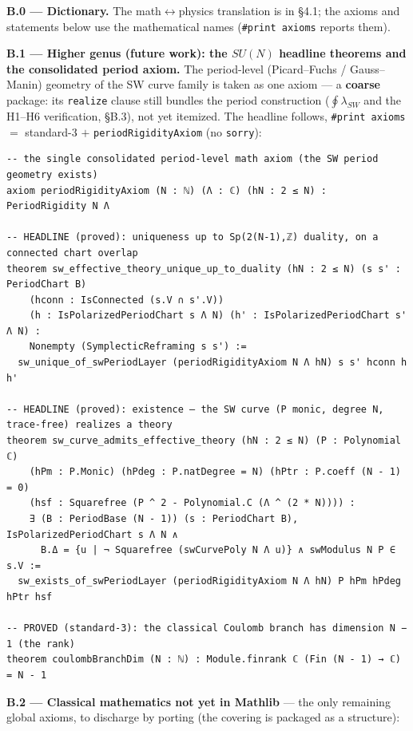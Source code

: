 \documentclass{article}
\theoremstyle{plain}
\theoremstyle{definition}
\numberwithin{equation}{section}
\newcommand{\code}[1]{\texttt{#1}}
\begin{document}
\medskip
\medskip
\noindent\textbf{B.0 --- Dictionary.} The math$\leftrightarrow$physics translation is in \S4.1; the
axioms and statements below use the mathematical names (\code{\#print axioms} reports them).

\medskip
\noindent\textbf{B.1 --- Higher genus (future work): the $SU(N)$ headline theorems and the consolidated period axiom.} The period-level
(Picard--Fuchs / Gauss--Manin) geometry of the SW curve family is taken as one axiom --- a
\textbf{coarse} package: its \code{realize} clause still bundles the period construction
($\oint\lambda_{SW}$ and the H1--H6 verification, \S B.3), not yet itemized. The headline follows, \code{\#print axioms} $=$ standard-3 $+$ \code{periodRigidityAxiom} (no \code{sorry}):

\begin{Verbatim}
-- the single consolidated period-level math axiom (the SW period geometry exists)
axiom periodRigidityAxiom (N : ℕ) (Λ : ℂ) (hN : 2 ≤ N) : PeriodRigidity N Λ

-- HEADLINE (proved): uniqueness up to Sp(2(N-1),ℤ) duality, on a connected chart overlap
theorem sw_effective_theory_unique_up_to_duality (hN : 2 ≤ N) (s s' : PeriodChart B)
    (hconn : IsConnected (s.V ∩ s'.V))
    (h : IsPolarizedPeriodChart s Λ N) (h' : IsPolarizedPeriodChart s' Λ N) :
    Nonempty (SymplecticReframing s s') :=
  sw_unique_of_swPeriodLayer (periodRigidityAxiom N Λ hN) s s' hconn h h'

-- HEADLINE (proved): existence — the SW curve (P monic, degree N, trace-free) realizes a theory
theorem sw_curve_admits_effective_theory (hN : 2 ≤ N) (P : Polynomial ℂ)
    (hPm : P.Monic) (hPdeg : P.natDegree = N) (hPtr : P.coeff (N - 1) = 0)
    (hsf : Squarefree (P ^ 2 - Polynomial.C (Λ ^ (2 * N)))) :
    ∃ (B : PeriodBase (N - 1)) (s : PeriodChart B), IsPolarizedPeriodChart s Λ N ∧
      B.Δ = {u | ¬ Squarefree (swCurvePoly N Λ u)} ∧ swModulus N P ∈ s.V :=
  sw_exists_of_swPeriodLayer (periodRigidityAxiom N Λ hN) P hPm hPdeg hPtr hsf

-- PROVED (standard-3): the classical Coulomb branch has dimension N − 1 (the rank)
theorem coulombBranchDim (N : ℕ) : Module.finrank ℂ (Fin (N - 1) → ℂ) = N - 1
\end{Verbatim}

\medskip
\noindent\textbf{B.2 --- Classical mathematics not yet in Mathlib} --- the only remaining global
axioms, to discharge by porting (the covering is packaged as a structure):
\end{document}
